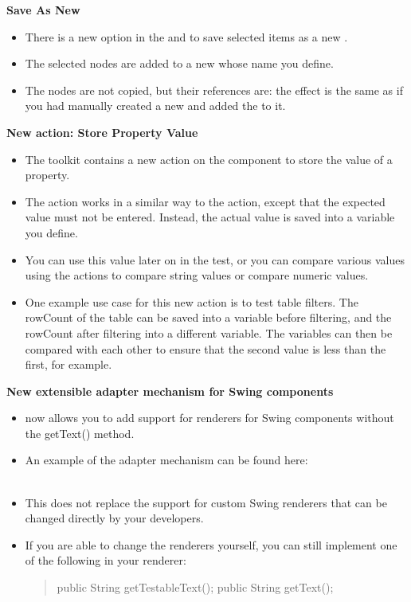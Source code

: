 \textbf{Save As New \gdcase{}}
\begin{itemize}
\item There is a new option in the \gdtestcaseeditor{} and \gdtestsuiteeditor{} to save selected items as a new \gdcase{}.
\item The selected nodes are added to a new \gdcase{} whose name you define.
\item The nodes are not copied, but their references are: the effect is the same as if you had manually created a new \gdcase{} and added the \gdcases{} to it. 
\end{itemize}

\textbf{New action: Store Property Value}\\
\begin{itemize}
\item The  toolkit contains a new action on the  component to store the value of a property.
\item The action works in a similar way to the  action, except that the expected value must not be entered. Instead, the actual value is saved into a variable you define.
\item You can use this value later on in the test, or you can compare various values using the actions to compare string values or compare numeric values. 
\item One example use case for this new action is to test table filters. The rowCount of the table can be saved into a variable before filtering, and the rowCount after filtering into a different variable. The variables can then be compared with each other to ensure that the second value is less than the first, for example.
\end{itemize} 

\textbf{New extensible adapter mechanism for Swing components}\\
\begin{itemize}
\item \app{} now allows you to add support for renderers for Swing components without the getText() method.
\item An example of the adapter mechanism can be found here:\\
\\
\item This does not replace the support for custom Swing renderers that can be changed directly by your developers. 
\item If you are able to change the renderers yourself, you can still implement one of the following in your renderer:
\begin{quote}
public String getTestableText();
public String getText();
\end{quote}
\end{itemize}

